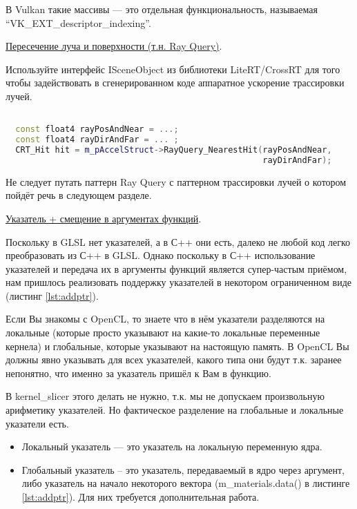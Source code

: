 \documentclass[11pt,fleqn,english,russian]{report} %
\begin{document}
В Vulkan такие массивы --- это отдельная функциональность, называемая \newline ``VK\_EXT\_descriptor\_indexing''. 

\noindent\underline{Пересечение луча и поверхности (т.н. Ray Query)}.

Используйте интерфейс ISceneObject из библиотеки LiteRT/CrossRT \cite{litert} для того чтобы задействовать в сгенерированном коде аппаратное ускорение трассировки лучей.

\begin{lstlisting}[language=C++, 
	caption=поиск пересечения луча и поверхности, 
	label=lst:ray_query_hit]

  const float4 rayPosAndNear = ...;
  const float4 rayDirAndFar = ... ;		
  CRT_Hit hit = m_pAccelStruct->RayQuery_NearestHit(rayPosAndNear, 
                                                    rayDirAndFar);

\end{lstlisting}

\begin{remark}
Не следует путать паттерн Ray Query с паттерном трассировки лучей о котором пойдёт речь в следующем разделе. 
\end{remark}

\noindent\underline{Указатель + смещение в аргументах функций}.

Поскольку в GLSL нет указателей, а в С++ они есть, далеко не любой код легко преобразовать из С++ в GLSL. Однако поскольку в С++ использование указателей и передача их в аргументы функций является супер-частым приёмом, нам пришлось реализовать поддержку указателей в некотором ограниченном виде (листинг \ref{lst:addptr}). 

Если Вы знакомы с OpenCL, то знаете что в нём указатели разделяются на локальные (которые просто указывают на какие-то локальные переменные кернела) и глобальные, которые указывают на настоящую память. В OpenCL Вы должны явно указывать для всех указателей, какого типа они будут т.к. заранее непонятно, что именно за указатель пришёл к Вам в функцию. 

В kernel\_slicer этого делать не нужно, т.к. мы не допускаем произвольную арифметику указателей. Но фактическое разделение на глобальные и локальные указатели есть.

\begin{itemize}
\item Локальный указатель  --- это указатель на локальную переменную ядра.  
\item Глобальный указатель -- это указатель, передаваемый в ядро через аргумент, либо указатель на начало некоторого вектора (m\_materials.data() в листинге \ref{lst:addptr}). Для них требуется дополнительная работа.
\end{itemize}
\end{document}
